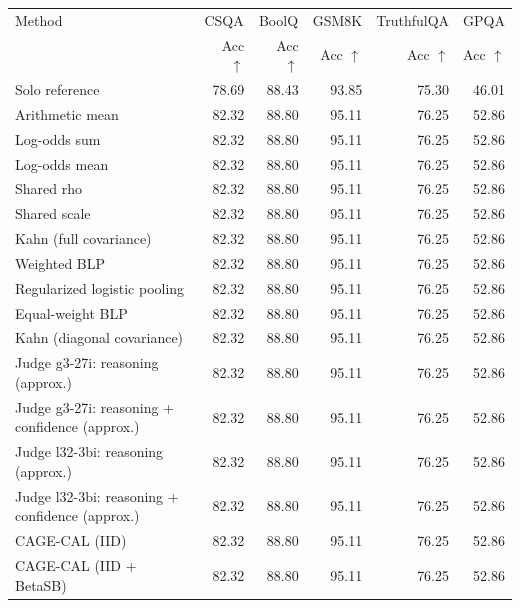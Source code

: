 \begin{tabular}{lrrrrr}
\toprule
Method & \multicolumn{1}{c}{CSQA} & \multicolumn{1}{c}{BoolQ} & \multicolumn{1}{c}{GSM8K} & \multicolumn{1}{c}{TruthfulQA} & \multicolumn{1}{c}{GPQA} \\
 & Acc $\uparrow$ & Acc $\uparrow$ & Acc $\uparrow$ & Acc $\uparrow$ & Acc $\uparrow$ \\
\midrule
Solo reference & 78.69 & 88.43 & 93.85 & 75.30 & 46.01 \\
Arithmetic mean & 82.32 & 88.80 & 95.11 & 76.25 & 52.86 \\
Log-odds sum & 82.32 & 88.80 & 95.11 & 76.25 & 52.86 \\
Log-odds mean & 82.32 & 88.80 & 95.11 & 76.25 & 52.86 \\
Shared rho & 82.32 & 88.80 & 95.11 & 76.25 & 52.86 \\
Shared scale & 82.32 & 88.80 & 95.11 & 76.25 & 52.86 \\
Kahn (full covariance) & 82.32 & 88.80 & 95.11 & 76.25 & 52.86 \\
Weighted BLP & 82.32 & 88.80 & 95.11 & 76.25 & 52.86 \\
Regularized logistic pooling & 82.32 & 88.80 & 95.11 & 76.25 & 52.86 \\
Equal-weight BLP & 82.32 & 88.80 & 95.11 & 76.25 & 52.86 \\
Kahn (diagonal covariance) & 82.32 & 88.80 & 95.11 & 76.25 & 52.86 \\
Judge g3-27i: reasoning (approx.) & 82.32 & 88.80 & 95.11 & 76.25 & 52.86 \\
Judge g3-27i: reasoning + confidence (approx.) & 82.32 & 88.80 & 95.11 & 76.25 & 52.86 \\
Judge l32-3bi: reasoning (approx.) & 82.32 & 88.80 & 95.11 & 76.25 & 52.86 \\
Judge l32-3bi: reasoning + confidence (approx.) & 82.32 & 88.80 & 95.11 & 76.25 & 52.86 \\
CAGE-CAL (IID) & 82.32 & 88.80 & 95.11 & 76.25 & 52.86 \\
CAGE-CAL (IID + BetaSB) & 82.32 & 88.80 & 95.11 & 76.25 & 52.86 \\
\bottomrule
\end{tabular}
